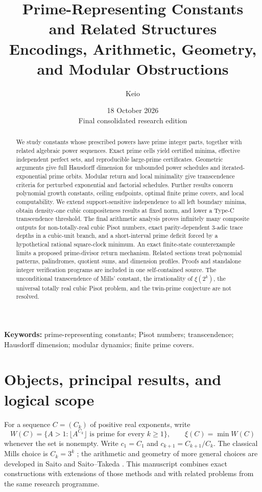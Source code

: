\documentclass[11pt,a4paper]{article}
\title{\bfseries Prime-Representing Constants\\and Related Structures\\[7pt]
\large Encodings, Arithmetic, Geometry,\\and Modular Obstructions}
\author{Keio}
\date{18 October 2026\\\small Final consolidated research edition}
\theoremstyle{definition}
\theoremstyle{remark}
\numberwithin{equation}{section}
\begin{document}
\maketitle
\begin{abstract}
We study constants whose prescribed powers have prime integer parts,
together with related algebraic power sequences. Exact prime cells yield
certified minima, effective independent perfect sets, and reproducible
large-prime certificates. Geometric arguments give full Hausdorff
dimension for unbounded power schedules and iterated-exponential prime
orbits. Modular return and local minimality give transcendence criteria
for perturbed exponential and factorial schedules. Further results concern
polynomial growth constants, ceiling endpoints, optimal finite prime
covers, and local computability. We extend support-sensitive independence
to all left boundary minima, obtain density-one cubic compositeness
results at fixed norm, and lower a Type-C transcendence threshold.
The final arithmetic analysis proves infinitely many composite outputs
for non-totally-real cubic Pisot numbers, exact parity-dependent
$3$-adic trace depths in a cubic-unit branch, and a short-interval prime
deficit forced by a hypothetical rational square-clock minimum.
An exact finite-state counterexample limits a proposed prime-divisor
return mechanism. Related sections treat polynomial patterns,
palindromes, quotient sums, and dimension profiles. Proofs and standalone
integer verification programs are included in one self-contained source.
The unconditional transcendence of Mills' constant, the irrationality of
$\xi(2^k)$, the universal totally real cubic Pisot problem, and the
twin-prime conjecture are not resolved.
\end{abstract}
\noindent\textbf{Keywords:} prime-representing constants; Pisot numbers;
transcendence; Hausdorff dimension; modular dynamics; finite prime covers.
\clearpage
\begingroup\small\setlength{\parskip}{0pt}
\tableofcontents
\endgroup
\clearpage

\renewcommand{\theHtable}{intro.\arabic{table}}
\section{Objects, principal results, and logical scope}
\label{sec:overview}
For a sequence $C=(C_k)$ of positive real exponents, write
\[
 W(C)=\{A>1:\lfloor A^{C_k}\rfloor\text{ is prime for every }k\ge1\},
 \qquad \xi(C)=\min W(C)
\]
whenever the set is nonempty. Write $c_1=C_1$ and
$c_{k+1}=C_{k+1}/C_k$. The classical Mills choice is $C_k=3^k$
\cite{Mills1947}; the arithmetic and geometry of more general choices
are developed in Saito and Saito--Takeda
\cite{SaitoDimension2021,SaitoTakeda2022,SaitoMills,SaitoVariants}.
This manuscript combines exact constructions with extensions of those
methods and with related problems from the same research programme.
\end{document}
